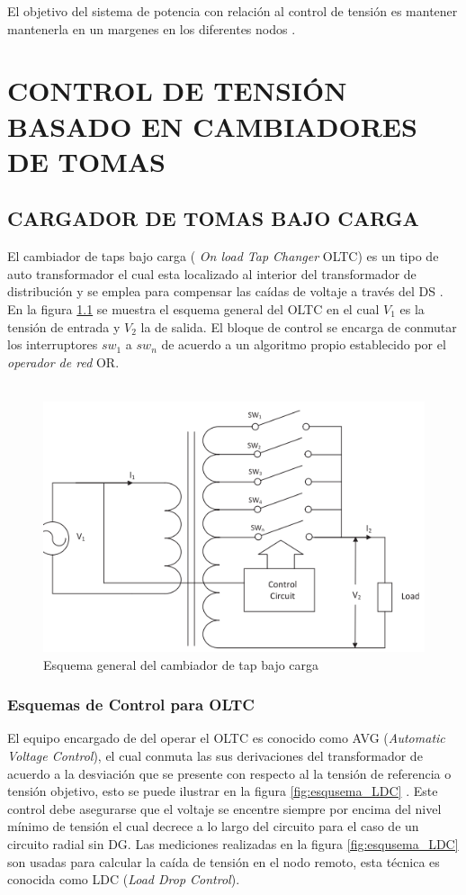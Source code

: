 \documentclass[12pt, letterpaper]{report}
\begin{document}
El objetivo del sistema de potencia con relación al control de tensión es mantener mantenerla en un margenes en los diferentes nodos \cite{Liu2012}. 


\chapter{CONTROL DE TENSIÓN BASADO EN CAMBIADORES DE TOMAS}
\label{cap_oltc} 

\section{CARGADOR DE TOMAS BAJO CARGA}

El cambiador de taps bajo carga  ( \textit{On load Tap Changer } OLTC) es un tipo de auto transformador el cual esta localizado al interior del transformador de distribución y  se emplea para compensar las caídas de voltaje  a través del DS \cite{Castro2016}. En la figura \ref{fig:esquema_OLTC} se muestra el esquema general del OLTC en el cual $V_{1}$ es la tensión de entrada  y $V_{2}$ la de salida. El bloque  de control se encarga de conmutar los interruptores $sw_{1}$ a $sw_{n}$ de acuerdo a un algoritmo propio establecido por el \textit{operador de red} OR.\\\\
\begin{figure}[h]
    \centering
    \includegraphics[width=0.6\linewidth]{imagenes/cap_1/Selection_275}
    \caption{Esquema general del cambiador de tap bajo carga \cite{Castro2016}}
    \label{fig:esquema_OLTC}
\end{figure}
\subsection{Esquemas de Control para OLTC}
El equipo encargado de del operar el OLTC es conocido como AVG (\textit{Automatic Voltage Control}), el cual conmuta las sus derivaciones del transformador de acuerdo a la desviación que se presente con respecto al la tensión de referencia o tensión objetivo, esto se puede ilustrar en la figura \ref{fig:esqusema_LDC} \cite{Sarimuthu2016}. Este control debe asegurarse que el voltaje se encentre siempre por encima del nivel mínimo de tensión el cual decrece a lo largo del circuito \cite{Sarimuthu2016} para el caso de un circuito radial sin DG. Las  mediciones realizadas en la figura \ref{fig:esqusema_LDC} son usadas para calcular la caída de tensión en el nodo remoto, esta técnica es conocida como LDC (\textit{Load Drop Control}).\\\\
\end{document}
